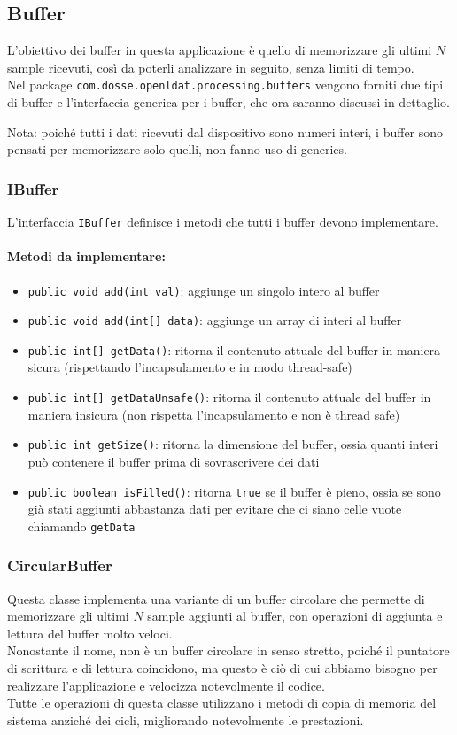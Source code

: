\subsection{Buffer}
L'obiettivo dei buffer in questa applicazione è quello di memorizzare gli ultimi $N$ sample ricevuti, così da poterli analizzare in seguito, senza limiti di tempo.\\
Nel package \texttt{com.dosse.openldat.processing.buffers} vengono forniti due tipi di buffer e l'interfaccia generica per i buffer, che ora saranno discussi in dettaglio.

Nota: poiché tutti i dati ricevuti dal dispositivo sono numeri interi, i buffer sono pensati per memorizzare solo quelli, non fanno uso di generics.

\subsubsection{IBuffer}
L'interfaccia \texttt{IBuffer} definisce i metodi che tutti i buffer devono implementare.

\paragraph{Metodi da implementare:}\begin{itemize}
	\item \texttt{public void add(int val)}: aggiunge un singolo intero al buffer
	\item \texttt{public void add(int[] data)}: aggiunge un array di interi al buffer
	\item \texttt{public int[] getData()}: ritorna il contenuto attuale del buffer in maniera sicura (rispettando l'incapsulamento e in modo thread-safe)
	\item \texttt{public int[] getDataUnsafe()}: ritorna il contenuto attuale del buffer in maniera insicura (non rispetta l'incapsulamento e non è thread safe)
	\item \texttt{public int getSize()}: ritorna la dimensione del buffer, ossia quanti interi può contenere il buffer prima di sovrascrivere dei dati
	\item \texttt{public boolean isFilled()}: ritorna \texttt{true} se il buffer è pieno, ossia se sono già stati aggiunti abbastanza dati per evitare che ci siano celle vuote chiamando \texttt{getData}
\end{itemize}

\subsubsection{CircularBuffer}
Questa classe implementa una variante di un buffer circolare che permette di memorizzare gli ultimi $N$ sample aggiunti al buffer, con operazioni di aggiunta e lettura del buffer molto veloci.\\
Nonostante il nome, non è un buffer circolare in senso stretto, poiché il puntatore di scrittura e di lettura coincidono, ma questo è ciò di cui abbiamo bisogno per realizzare l'applicazione e velocizza notevolmente il codice.\\
Tutte le operazioni di questa classe utilizzano i metodi di copia di memoria del sistema anziché dei cicli, migliorando notevolmente le prestazioni.


